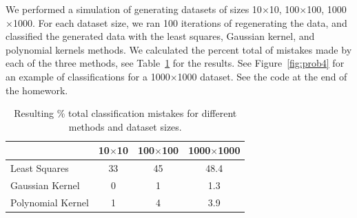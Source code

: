 \documentclass{article}
\begin{document}
\begin{homeworkProblem}
  
    We performed a simulation of generating datasets of sizes 10$\times$10,
    100$\times$100, 1000$\times$1000. For each dataset size, we ran 100
    iterations of regenerating the data, and classified the generated data with
    the least squares, Gaussian kernel, and polynomial kernels methods. We
    calculated the percent total of mistakes made by each of the three methods,
    see Table~\ref{table:prob4} for the results. See Figure~\ref{fig:prob4} for
    an example of classifications for a 1000$\times$1000 dataset. See the code
    at the end of the homework.

    \begin{table}[!ht]

        \caption{\label{table:prob4} Resulting \% total classification mistakes
        for different methods and dataset sizes.}

        \begin{center}
            \begin{tabular}{lccc}
                
                & 10$\times$10 & 100$\times$100 & 1000$\times$1000 \\
                \hline \hline
                Least Squares     & 33 & 45 & 48.4 \\
                Gaussian Kernel   & 0  & 1 & 1.3 \\
                Polynomial Kernel & 1  & 4 & 3.9 \\

            \end{tabular}
        \end{center}
    \end{table}

    \begin{figure}[!ht]
        
        \begin{centering}
        

\end{centering}
\end{figure}
\end{homeworkProblem}
\end{document}

